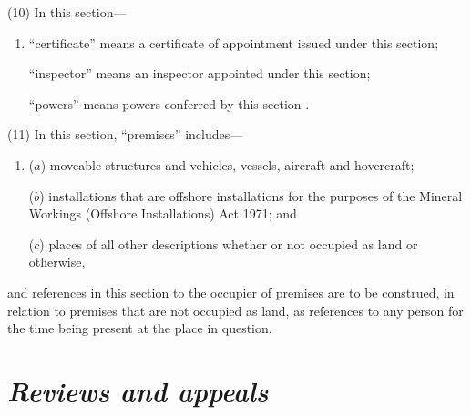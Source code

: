 \documentclass[12pt,a4paper]{article}
\begin{document}
(10) In this section—
\begin{enumerate}\item[]
    “certificate” means a certificate of appointment issued under this section;

    “inspector” means an inspector appointed under this section;

    “powers” means powers conferred by this section%
%
. 
\end{enumerate}

(11) In this section, “premises” includes—
\begin{enumerate}\item[]
($a$) moveable structures and vehicles, vessels, aircraft and hovercraft;

($b$) installations that are offshore installations for the purposes of the Mineral Workings (Offshore Installations) Act 1971; and

($c$) places of all other descriptions whether or not occupied as land or otherwise,
\end{enumerate}
and references in this section to the occupier of premises are to be construed, in relation to premises that are not occupied as land, as references to any person for the time being present at the place in question.


\section{\itshape Reviews and appeals}
\end{document}
